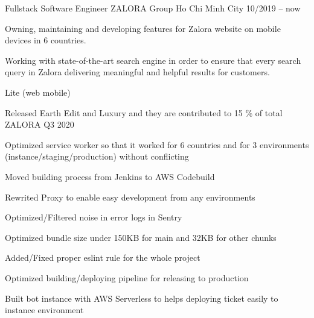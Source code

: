 

\begin{cventries}

  \cventry
    {Fullstack Software Engineer} %
    {ZALORA Group} %
    {Ho Chi Minh City} %
    {10/2019 -- now} %
    {
      \begin{cvitems} %
        \item {Owning, maintaining and developing features for Zalora website on mobile devices in 6 countries.}
        \item {Working with state-of-the-art search engine in order to ensure that every search query in Zalora delivering meaningful and helpful results for customers.}
      \end{cvitems}
    }
     \cventry
    {Lite (web mobile)} %
    {} %
    {} %
    {} %
    {
      \begin{cvitems} %
        \item {Released Earth Edit and Luxury and they are contributed to 15 \% of total ZALORA Q3 2020}
        \item {Optimized service worker so that it worked for 6 countries and for 3 environments (instance/staging/production) without conflicting}
        \item {Moved building process from Jenkins to AWS Codebuild}
        \item {Rewrited Proxy to enable easy development from any environments}
        \item {Optimized/Filtered noise in error logs in Sentry}
        \item {Optimized bundle size under 150KB for main and 32KB for other chunks}
        \item {Added/Fixed proper eslint rule for the whole project}
        \item{Optimized building/deploying pipeline for releasing to production}
        \item {Built bot instance with AWS Serverless to helps deploying ticket easily to instance environment}
      \end{cvitems}
    }
    

\end{cventries}
